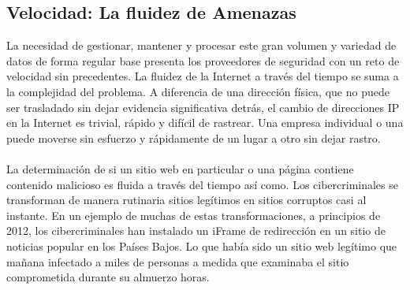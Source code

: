\documentclass[journal]{IEEEtran}
\begin{document}
\subsection{Velocidad: La fluidez de Amenazas}
La necesidad de gestionar, mantener y procesar este gran volumen y variedad de datos de forma regular base presenta los proveedores de seguridad con un reto de velocidad sin precedentes. La fluidez de la Internet a través del tiempo se suma a la complejidad del problema. A diferencia de una dirección física, que no puede ser trasladado sin dejar evidencia significativa detrás, el cambio de direcciones IP en la Internet es trivial, rápido y difícil de rastrear. Una empresa individual o una puede moverse sin esfuerzo y rápidamente de un lugar a otro sin dejar rastro.\\ \\
La determinación de si un sitio web en particular o una página contiene contenido malicioso es fluida a través del tiempo así como. Los cibercriminales se transforman de manera rutinaria sitios legítimos en sitios corruptos casi al instante. En un ejemplo de muchas de estas transformaciones, a principios de 2012, los cibercriminales han instalado un iFrame de redirección en un sitio de noticias popular en los Países Bajos. Lo que había sido un sitio web legítimo que mañana infectado a miles de personas a medida que examinaba el sitio comprometida durante su almuerzo horas.
\end{document}
